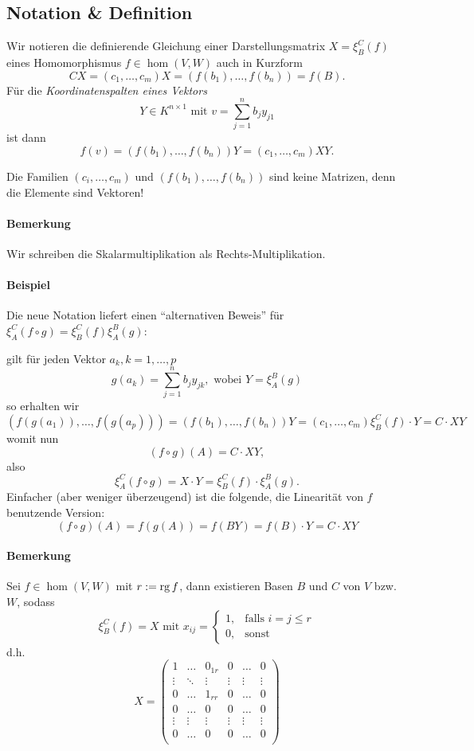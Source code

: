 \subsection{Notation \& Definition}
	\begin{Definition}
	Wir notieren die definierende Gleichung einer Darstellungsmatrix $ X=\xi_B^C(f) $ eines Homomorphismus $ f\in \hom(V,W) $ auch in Kurzform
		\[ CX=(c_1,\dots,c_m)X = (f(b_1),\dots,f(b_n)) = f(B). \]
	Für die \emph{Koordinatenspalten eines Vektors}
		\[ Y\in K^{n\times 1} \text{ mit } v=\sum_{j=1}^{n}b_jy_{j1} \]
	ist dann
		\[ f(v) = (f(b_1),\dots,f(b_n))Y = (c_1,\dots,c_m)XY. \]
	\end{Definition}
	Die Familien $ (c_i,\dots,c_m) $ und $ (f(b_1),\dots,f(b_n)) $ sind keine Matrizen, denn die Elemente sind Vektoren!
\paragraph{Bemerkung}
	Wir schreiben die Skalarmultiplikation als Rechts-Multiplikation.
\paragraph{Beispiel}
	Die neue Notation liefert einen "`alternativen Beweis"' für $ \xi_A^C(f\circ g) = \xi_B^C(f)\xi_A^B(g) $:
	
	gilt für jeden Vektor $ a_k,k=1,\dots,p $
		\[ g(a_k) = \sum_{j=1}^{n}b_jy_{jk}, \text{ wobei } Y = \xi_A^B(g) \]
	so erhalten wir
		\[ (f(g(a_1)),\dots, f(g(a_p))) = (f(b_1),\dots , f(b_n))Y = (c_1,\dots,c_m)\xi_B^C(f)\cdot Y = C\cdot XY \]
	womit nun
		\[ (f\circ g)(A) = C\cdot XY, \]
	also
		\[ \xi_A^C(f\circ g) = X\cdot Y = \xi_B^C(f)\cdot \xi_A^B(g). \]
	Einfacher (aber weniger überzeugend) ist die folgende, die Linearität von $ f $ benutzende Version:
		\[( f\circ g )(A) = f(g(A)) = f(BY) = f(B)\cdot Y = C\cdot XY\]
\paragraph{Bemerkung}
	Sei $ f\in \hom(V,W) $ mit $ r:= \operatorname{rg} f $, dann existieren Basen $ B $ und $ C $ von $ V $ bzw. $ W $, sodass
		\[ \xi_B^C(f) = X \text{ mit } x_{ij} =
			\begin{cases}
			1,& \text{falls }i=j\leq r\\
			0,& \text{sonst}
			\end{cases} \]
	d.h.
		\[ X = \left(\begin{array}{ccc|ccc}
		1      & \dots  & 0_{1r} & 0      &\dots &0 \\
		\vdots & \ddots & \vdots & \vdots &\vdots&\vdots\\
		0      & \dots  & 1_{rr} & 0      &\dots &0 \\\hline
		0      & \dots  & 0      & 0      &\dots &0 \\
		\vdots & \vdots & \vdots & \vdots &\vdots&\vdots \\
                0      & \dots  & 0      & 0      &\dots &0\\
		\end{array}\right) \]
		
